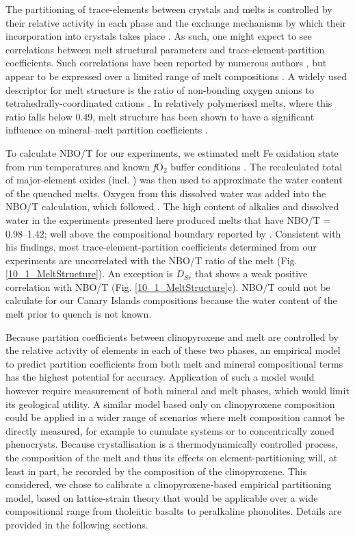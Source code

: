 \documentclass[final,authoryear,3p,times,twocolumn]{elsarticle}
\newcommand{\fO}{\textit{f}O$_{2}$ }
\begin{document}
The partitioning of trace-elements between crystals and melts is controlled by their relative activity in each phase and the exchange mechanisms by which their incorporation into crystals takes place \citep[e.g., Jd-melt, Jd-DiHd and CaTS-DiHd exchanges have been shown to control REE incorporation in cpx, ][]{Putirka2008,Wood2014,Mollo2017}. As such, one might expect to see correlations between melt structural parameters and trace-element-partition coefficients. Such correlations have been reported by numerous authors \citep[e.g.,][]{Schmidt2006,Mollo2017}, but appear to be expressed over a limited range of melt compositions \citep{Gaetani2004,Huang2006}. A widely used descriptor for melt structure is the ratio of non-bonding oxygen anions to tetrahedrally-coordinated cations \citep[$\frac{NBO}{T}$,][]{Mysen1982,Mysen1985}. In relatively polymerised melts, where this ratio falls below 0.49, melt structure has been shown to have a significant influence on mineral--melt partition coefficients \citep{Gaetani2004,Huang2006}. 
    
    To calculate NBO/T for our experiments, we estimated melt Fe oxidation state from run temperatures and known \fO buffer conditions \citep{Kress1991}. The recalculated total of major-element oxides (incl. ) was then used to approximate the water content of the quenched melts. Oxygen from this dissolved water was added into the NBO/T calculation, which followed \citet{Mysen1985}. The high content of alkalies and dissolved water in the experiments presented here produced melts that have NBO/T = 0.98--1.42; well above the compositional boundary reported by \citet[][]{Gaetani2004}. 
Consistent with his findings, most trace-element-partition coefficients determined from our experiments are uncorrelated with the NBO/T ratio of the melt (Fig. \ref{10_1_MeltStructure}). An exception is $D_{Sr}$ that shows a weak positive correlation with NBO/T (Fig. \ref{10_1_MeltStructure}c). NBO/T could not be calculate for our Canary Islands compositions because the water content of the melt prior to quench is not known.

Because partition coefficients between clinopyroxene and melt are controlled by the relative activity of elements in each of these two phases, an empirical model to predict partition coefficients from both melt and mineral compositional terms has the highest potential for accuracy. Application of such a model would however require measurement of both mineral and melt phases, which would limit its geological utility. 
    A similar model based only on clinopyroxene composition could be applied in a wider range of scenarios where melt composition cannot be directly measured, for example to cumulate systems or to concentrically zoned phenocrysts.
Because crystallisation is a thermodynamically controlled process, the composition of the melt and thus its effects on element-partitioning will, at least in part, be recorded by the composition of the clinopyroxene. This considered, we chose to calibrate a clinopyroxene-based empirical partitioning model, based on lattice-strain theory that would be applicable over a wide compositional range from tholeiitic basalts to peralkaline phonolites. Details are provided in the following sections.  
\end{document}
